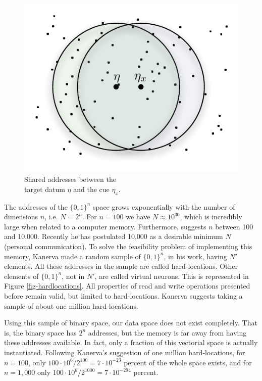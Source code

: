 \begin{figure}[!htb]
\centering\includegraphics[scale=0.75]{./images02/p1_inter_p2.pdf}

\caption{Shared addresses between the \protect \\
target datum $\eta$ and the cue $\eta_{x}$. \label{fig-shared-addresses}}
\end{figure}


The addresses of the $\{0,1\}^{n}$ space grows exponentially with the number of dimensions $n$, i.e. $N=2^{n}$. For $n=100$ we have $N\approx10^{30}$, which is incredibly large when related to a computer memory. Furthermore, \citet{Kanerva1988} suggests $n$ between 100 and 10,000. Recently he has postulated 10,000 as a desirable minimum $N$ (personal communication). To solve the feasibility problem of implementing this memory, Kanerva made a random sample of $\{0,1\}^{n}$, in his work, having $N'$ elements. All these addresses in the sample are called hard-locations. Other elements of $\{0,1\}^{n}$, not in $N'$, are called virtual neurons. This is represented in Figure \ref{fig-hardlocations}.  All properties of read and write operations presented before remain valid, but limited to hard-locations. Kanerva suggests taking a sample of about one million hard-locations.

Using this sample of binary space, our data space does not exist completely.  That is, the binary space has $2^{n}$ addresses, but the memory is far away from having these addresses available. In fact, only a fraction of this vectorial space is actually instantiated. Following Kanerva's suggestion of one million hard-locations, for $n=100$, only $100\cdot10^{6}/2^{100}=7\cdot10^{-23}$ percent of the whole space exists, and for $n=1,000$ only $100\cdot10^{6}/2^{1000}=7\cdot10^{-294}$ percent.

